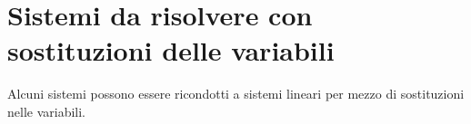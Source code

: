 % 
% 
% 

\section{Sistemi da risolvere con sostituzioni delle variabili}
\label{sec:compl1_sistemisotituzionevariabili}

Alcuni sistemi possono essere ricondotti a sistemi lineari per mezzo di
sostituzioni nelle variabili.

